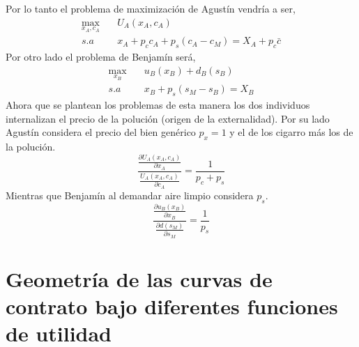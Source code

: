 Por lo tanto el problema de maximización de Agustín vendría a ser,
\begin{align*}
    \max_{x_A,c_A} &\quad U_A(x_A,c_A) \\
    s.a &\quad x_A + p_cc_A+p_s(c_A-c_M) = X_A + p_c\bar{c}
\end{align*}
Por otro lado el problema de Benjamín será,
\begin{align*}
    \max_{x_B} \quad & u_B (x_B) +d_B(s_B) \\
    s.a \quad &x_B + p_s(s_M - s_B) = X_B
\end{align*}
Ahora que se plantean los problemas de esta manera los dos individuos internalizan el precio de la polución (origen de la externalidad). Por su lado Agustín considera el precio del bien genérico $p_x =1$ y el de los cigarro más los de la polución. 
\begin{equation*}
    \frac{\frac{\partial U_A(x_A,c_A)}{\partial x_A}}{\frac{U_A(x_A,c_A)}{\partial c_A}} = \frac{1}{p_c+p_s}
\end{equation*} 
Mientras que Benjamín al demandar aire limpio considera $p_s$.
\begin{equation*}
    \frac{\frac{\partial u_B(x_B)}{\partial x_B}}{\frac{\partial d(s_M)}{\partial s_M}} = \frac{1}{p_s}
\end{equation*}


\section{Geometría de las curvas de contrato bajo diferentes funciones de utilidad}